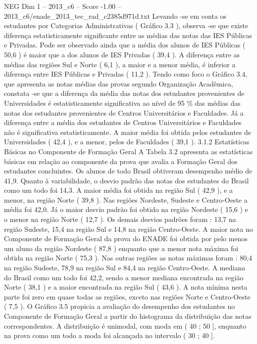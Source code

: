 \begin{textsample}{NEG Dim 1 – 2013\_c6 – Score -1.00 – 2013\_c6/enade\_2013\_tec\_rad\_c2385d971d.txt}
Levando -se em conta os estudantes por Categorias Administrativas ( Gráfico 3.3 ), observa -se que existe diferença estatisticamente significante entre as médias das notas das IES Públicas e Privadas.
Pode ser observado ainda que a média dos alunos de IES Públicas ( 50,6 ) é maior que a dos alunos de IES Privadas ( 39,4 ).
A diferença entre as médias das regiões Sul e Norte ( 6,1 ), a maior e a menor média, é inferior a diferença entre IES Públicas e Privadas ( 11,2 ).
Tendo como foco o Gráfico 3.4, que apresenta as notas médias das provas segundo Organização Acadêmica, constata -se que a diferença da média das notas dos estudantes provenientes de Universidades é estatisticamente significativa ao nível de 95 \% das médias das notas dos estudantes provenientes de Centros Universitários e Faculdades.
Já a diferença entre a média dos estudantes de Centros Universitários e Faculdades não é significativa estatisticamente.
A maior média foi obtida pelos estudantes de Universidades ( 42,4 ), e a menor, pelos de Faculdades ( 39,1 ). 3.1.2 Estatísticas Básicas no Componente de Formação Geral A Tabela 3.2 apresenta as estatísticas básicas em relação ao componente da prova que avalia a Formação Geral dos estudantes concluintes.
Os alunos de todo Brasil obtiveram desempenho médio de 41,9.
Quanto à variabilidade, o desvio padrão das notas dos estudantes do Brasil como um todo foi 14,3.
A maior média foi obtida na região Sul ( 42,9 ), e a menor, na região Norte ( 39,8 ).
Nas regiões Nordeste, Sudeste e Centro-Oeste a média foi 42,0.
Já o maior desvio padrão foi obtido na região Nordeste ( 15,6 ) e o menor na região Norte ( 12,7 ).
Os demais desvios padrões foram : 13,7 na região Sudeste, 15,4 na região Sul e 14,8 na região Centro-Oeste.
A maior nota no Componente de Formação Geral da prova do ENADE foi obtida por pelo menos um aluno da região Nordeste ( 87,8 ) enquanto que a menor nota máxima foi obtida na região Norte ( 75,3 ).
Nas outras regiões as notas máximas foram : 80,4 na região Sudeste, 78,9 na região Sul e 84,4 na região Centro-Oeste.
A mediana do Brasil como um todo foi 42,2, sendo a menor mediana encontrada na região Norte ( 38,1 ) e a maior encontrada na região Sul ( 43,6 ).
A nota mínima nesta parte foi zero em quase todas as regiões, exceto nas regiões Norte e Centro-Oeste ( 7,5 ).
O Gráfico 3.5 propicia a avaliação do desempenho dos estudantes no Componente de Formação Geral a partir do histograma da distribuição das notas correspondentes.
A distribuição é unimodal, com moda em ( 40 ; 50 ], enquanto na prova como um todo a moda foi alcançada no intervalo ( 30 ; 40 ].

\end{textsample}
